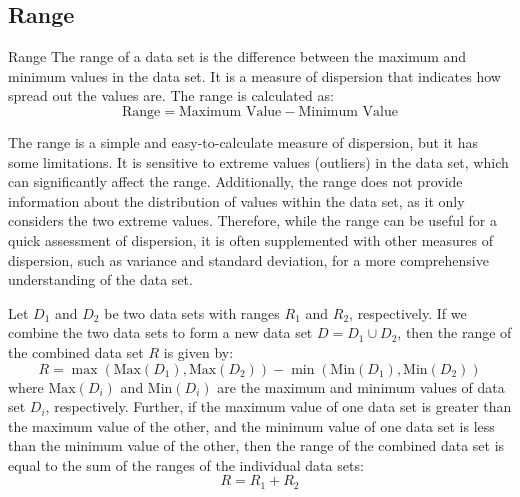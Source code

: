 \documentclass[openany]{book}
\begin{document}
\subsection{Range}
\begin{mydefinition}{Range}
    The range of a data set is the difference between the maximum and minimum values in the data set. It is a measure of dispersion that indicates how spread out the values are. The range is calculated as:
    $$\text{Range} = \text{Maximum Value} - \text{Minimum Value}$$
\end{mydefinition}
\begin{mynote}
    The range is a simple and easy-to-calculate measure of dispersion, but it has some limitations. It is sensitive to extreme values (outliers) in the data set, which can significantly affect the range. Additionally, the range does not provide information about the distribution of values within the data set, as it only considers the two extreme values. Therefore, while the range can be useful for a quick assessment of dispersion, it is often supplemented with other measures of dispersion, such as variance and standard deviation, for a more comprehensive understanding of the data set.
\end{mynote}
\begin{mytheorem}
    Let $D_1$ and $D_2$ be two data sets with ranges $R_1$ and $R_2$, respectively. If we combine the two data sets to form a new data set $D = D_1 \cup D_2$, then the range of the combined data set $R$ is given by:
    $$R = \max(\text{Max}(D_1), \text{Max}(D_2)) - \min(\text{Min}(D_1), \text{Min}(D_2))$$
    where $\text{Max}(D_i)$ and $\text{Min}(D_i)$ are the maximum and minimum values of data set $D_i$, respectively.
    Further, if the maximum value of one data set is greater than the maximum value of the other, and the minimum value of one data set is less than the minimum value of the other, then the range of the combined data set is equal to the sum of the ranges of the individual data sets:
    $$R = R_1 + R_2$$
\end{mytheorem}
\end{document}
